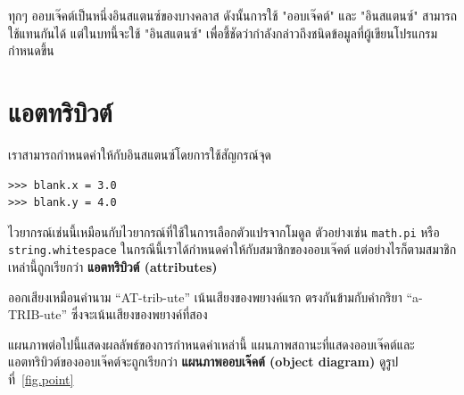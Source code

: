 
ทุกๆ ออบเจ๊คต์เป็นหนึ่งอินสแตนซ์ของบางคลาส ดังนั้นการใช้ "ออบเจ๊คต์" และ "อินสแตนซ์" สามารถใช้แทนกันได้ แต่ในบทนี้จะใช้ "อินสแตนซ์" เพื่อชี้ชัดว่ากำลังกล่าวถึงชนิดข้อมูลที่ผู้เขียนโปรแกรมกำหนดขึ้น

\section{แอตทริบิวต์ } %
\label{attributes}

เราสามารถกำหนดค่าให้กับอินสแตนซ์โดยการใช้สัญกรณ์จุด

\begin{verbatim}
>>> blank.x = 3.0
>>> blank.y = 4.0
\end{verbatim}
%

ไวยากรณ์เช่นนี้เหมือนกับไวยากรณ์ที่ใช้ในการเลือกตัวแปรจากโมดูล ตัวอย่างเช่น {\tt math.pi} หรือ {\tt string.whitespace}
ในกรณีนี้เราได้กำหนดค่าให้กับสมาชิกของออบเจ๊คต์ แต่อย่างไรก็ตามสมาชิกเหล่านี้ถูกเรียกว่า {\bf แอตทริบิวต์ (attributes)} 



ออกเสียงเหมือนคำนาม ``AT-trib-ute'' เน้นเสียงของพยางค์แรก ตรงกันข้ามกับคำกริยา ``a-TRIB-ute'' ซึ่งจะเน้นเสียงของพยางค์ที่สอง


แผนภาพต่อไปนี้แสดงผลลัพธ์ของการกำหนดค่าเหล่านี้  แผนภาพสถานะที่แสดงออบเจ๊คต์และแอตทริบิวต์ของออบเจ๊คต์จะถูกเรียกว่า {\bf แผนภาพออบเจ๊คต์ (object diagram)}
ดูรูปที่~\ref{fig.point}


